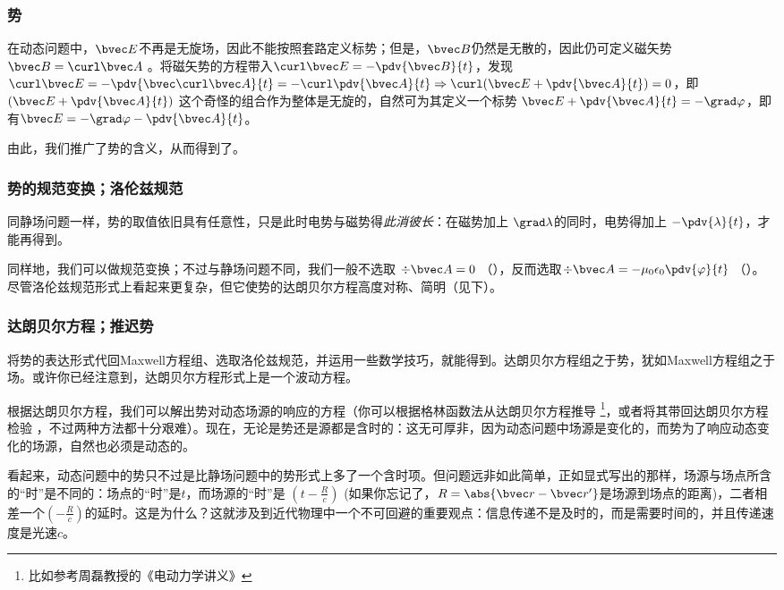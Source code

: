 \subsubsection{势}
在动态问题中，$\bvec E$不再是无旋场，因此不能按照套路定义标势；但是，$\bvec B$仍然是无散的，因此仍可定义磁矢势 $\bvec B = \curl \bvec A~$。将磁矢势的方程带入$ \curl \bvec E = -\pdv{\bvec B}{t}$，发现$ \curl \bvec E = -\pdv{\bvec \curl \bvec A}{t} = - \curl \pdv{\bvec A}{t} \Rightarrow \curl(\bvec E + \pdv{\bvec A}{t}) = 0$，即 $(\bvec E + \pdv{\bvec A}{t})$ 这个奇怪的组合作为整体是无旋的，自然可为其定义一个标势 $\bvec E + \pdv{\bvec A}{t} = -\grad \varphi$，即有$\bvec E  = -\grad \varphi - \pdv{\bvec A}{t} $。

由此，我们推广了势的含义，从而得到了。

\subsubsection{势的规范变换；洛伦兹规范}
同静场问题一样，势的取值依旧具有任意性，只是此时电势与磁势得\textsl{此消彼长}：在磁势加上 $\grad \lambda$的同时，电势得加上 $ - \pdv{\lambda}{t}$，才能再得到。

同样地，我们可以做规范变换；不过与静场问题不同，我们一般不选取 $\div \bvec A =0$ （），反而选取$\div \bvec A = -\mu_0 \epsilon_0 \pdv{\varphi}{t}~$（）。尽管洛伦兹规范形式上看起来更复杂，但它使势的达朗贝尔方程高度对称、简明（见下）。

\subsubsection{达朗贝尔方程；推迟势}
将势的表达形式代回Maxwell方程组、选取洛伦兹规范，并运用一些数学技巧，就能得到。达朗贝尔方程组之于势，犹如Maxwell方程组之于场。或许你已经注意到，达朗贝尔方程形式上是一个波动方程。

根据达朗贝尔方程，我们可以解出势对动态场源的响应的方程（你可以根据格林函数法从达朗贝尔方程推导 \footnote{比如参考周磊教授的《电动力学讲义》}，或者将其带回达朗贝尔方程检验 \cite{GriffE}，不过两种方法都十分艰难）。现在，无论是势还是源都是含时的：这无可厚非，因为动态问题中场源是变化的，而势为了响应动态变化的场源，自然也必须是动态的。

看起来，动态问题中的势只不过是比静场问题中的势形式上多了一个含时项。但问题远非如此简单，正如显式写出的那样，场源与场点所含的“时”是不同的：场点的“时”是$t$，而场源的“时”是 $(t-\frac{R}{c})$ (如果你忘记了，$R = \abs{\bvec r-\bvec r'}$是场源到场点的距离)，二者相差一个$(-\frac{R}{c})$的延时。这是为什么？这就涉及到近代物理中一个不可回避的重要观点：信息传递不是及时的，而是需要时间的，并且传递速度是光速$c$。

